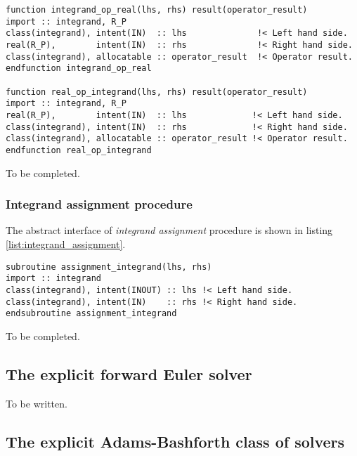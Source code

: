 \documentclass[pdftex,preprint,3p,times,numbers]{elsarticle}
\begin{document}
\begin{lstlisting}[firstnumber=1,style=code,caption={Integrand/real and real/integrand operators procedure interfaces},label={list:integrand_real_ops}]
function integrand_op_real(lhs, rhs) result(operator_result)
import :: integrand, R_P
class(integrand), intent(IN)  :: lhs              !< Left hand side.
real(R_P),        intent(IN)  :: rhs              !< Right hand side.
class(integrand), allocatable :: operator_result  !< Operator result.
endfunction integrand_op_real

function real_op_integrand(lhs, rhs) result(operator_result)
import :: integrand, R_P
real(R_P),        intent(IN)  :: lhs             !< Left hand side.
class(integrand), intent(IN)  :: rhs             !< Right hand side.
class(integrand), allocatable :: operator_result !< Operator result.
endfunction real_op_integrand
\end{lstlisting}

{\color{red} To be completed.}

\subsubsection{Integrand assignment procedure}

The abstract interface of \emph{integrand assignment} procedure is shown in listing \ref{list:integrand_assignment}.

\begin{lstlisting}[firstnumber=1,style=code,caption={integrand assignment procedure interface},label={list:integrand_assignment}]
subroutine assignment_integrand(lhs, rhs)
import :: integrand
class(integrand), intent(INOUT) :: lhs !< Left hand side.
class(integrand), intent(IN)    :: rhs !< Right hand side.
endsubroutine assignment_integrand
\end{lstlisting}

{\color{red} To be completed.}

\clearpage

\subsection{The explicit forward Euler solver}

{\color{red} To be written.}

\subsection{The explicit Adams-Bashforth class of solvers}
\end{document}
